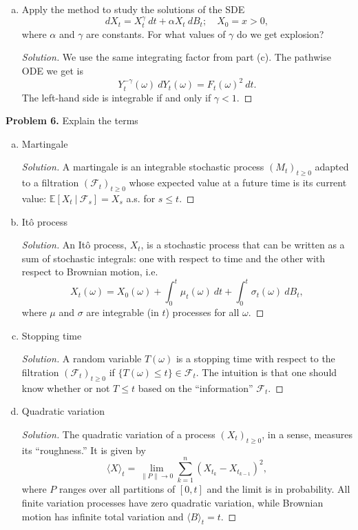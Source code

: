 \documentclass[11pt,letterpaper]{report}
\newcommand{\mcal}[1]{\mathcal{#1}}
\newcommand{\E}{\mathbb{E}}
\newenvironment{solution}
{\begin{proof}[Solution]}
{\end{proof}}
\begin{document}
\begin{enumerate}[(a)]
	\item Apply the method to study the solutions of the SDE
	\[
	dX_t = X_t^\gamma\ dt + \alpha X_t\ dB_t;\quad X_0 = x>0,
	\]
	where $\alpha$ and $\gamma$ are constants. For what values of $\gamma$ do we get explosion?
	\begin{solution}
		We use the same integrating factor from part (c). The pathwise ODE we get is
		\[
		Y_t^{-\gamma}(\omega)\ dY_t(\omega) = F_t(\omega)^2\ dt.
		\]
		The left-hand side is integrable if and only if $\gamma < 1$.
	\end{solution}
\end{enumerate}

\noindent\textbf{Problem 6. }
Explain the terms
\begin{enumerate}[(a)]
	\item Martingale
	\begin{solution}
		A martingale is an integrable stochastic process $(M_t)_{t\geq 0}$ adapted to a filtration $(\mcal{F}_t)_{t\geq 0}$ whose expected value at a future time is its current value: $\E[X_t\ |\ \mcal{F}_s] = X_s$ a.s. for $s\leq t$.
	\end{solution}

	\item It\^o process
	\begin{solution}
		An It\^o process, $X_t$, is a stochastic process that can be written as a sum of stochastic integrals: one with respect to time and the other with respect to Brownian motion, i.e.
		\[
		X_t(\omega) = X_0(\omega) + \int_0^t\mu_t(\omega)\ dt + \int_0^t\sigma_t(\omega)\ dB_t,
		\]
		where $\mu$ and $\sigma$ are integrable (in $t$) processes for all $\omega$.
	\end{solution}

	\item Stopping time
	\begin{solution}
		A random variable $T(\omega)$ is a stopping time with respect to the filtration $(\mcal{F}_t)_{t\geq 0}$ if $\{T(\omega)\leq t\}\in \mcal{F}_t$. The intuition is that one should know whether or not $T\leq t$ based on the ``information'' $\mcal{F}_t$.
	\end{solution}

	\item Quadratic variation
	\begin{solution}
		The quadratic variation of a process $(X_t)_{t\geq 0}$, in a sense, measures its ``roughness.'' It is given by
		\[
		\langle X\rangle_t = \lim_{\|P\|\to 0}\sum_{k=1}^n(X_{t_k}-X_{t_{k-1}})^2,
		\]
		where $P$ ranges over all partitions of $[0,t]$ and the limit is in probability. All finite variation processes have zero quadratic variation, while Brownian motion has infinite total variation and $\langle B\rangle_t = t$.
	\end{solution}


\end{enumerate}
\end{document}
